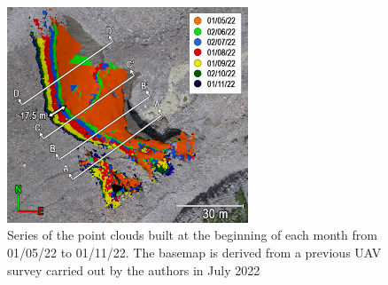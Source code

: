 \begin{figure}
  \centering
  \includegraphics[width=72mm]{4_sec_location.png}
  \caption{Series of the point clouds built at the beginning of each month from
    01/05/22 to 01/11/22.
    The basemap is derived from a previous UAV survey carried out by the
    authors in July 2022}
  \label{fig:4:section_locations}
\end{figure}

